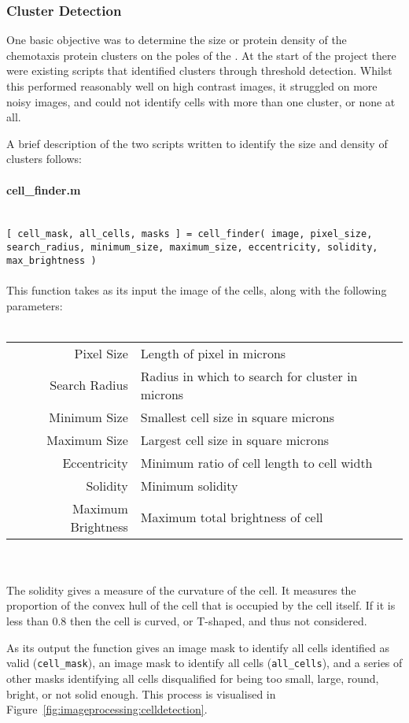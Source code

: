 \documentclass[../main.tex]{subfiles}
\begin{document}
\subsubsection{Cluster Detection}
One basic objective was to determine the size or protein density of the chemotaxis protein clusters on the poles of the \ecoli. At the start of the project there were existing scripts that identified clusters through threshold detection. Whilst this performed reasonably well on high contrast images, it struggled on more noisy images, and could not identify cells with more than one cluster, or none at all.

A brief description of the two scripts written to identify the size and density of clusters follows:

\paragraph{cell\_finder.m}\ \\
\texttt{[ cell\_mask, all\_cells, masks ] = cell\_finder( image, pixel\_size, search\_radius, minimum\_size, maximum\_size, eccentricity, solidity, max\_brightness ) }
\\\\
This function takes as its input the image of the cells, along with the following parameters:
\\\\
\begin{tabular}{rl}
Pixel Size		&	Length of pixel in microns\\
Search Radius 	&	Radius in which to search for cluster in microns\\
Minimum Size		&	Smallest cell size in square microns\\
Maximum Size		&	Largest cell size in square microns\\
Eccentricity		&	Minimum ratio of cell length to cell width\\
Solidity			&	Minimum solidity\\
Maximum Brightness	&	Maximum total brightness of cell
\end{tabular}
\\\\
The solidity gives a measure of the curvature of the cell. It measures the proportion of the convex hull of the cell that is occupied by the cell itself. If it is less than 0.8 then the cell is curved, or T-shaped, and thus not considered.

As its output the function gives an image mask to identify all cells identified as valid (\texttt{cell\_mask}), an image mask to identify all cells (\texttt{all\_cells}), and a series of other masks identifying all cells disqualified for being too small, large, round, bright, or not solid enough. This process is visualised in Figure~\ref{fig:imageprocessing:celldetection}.
\end{document}
